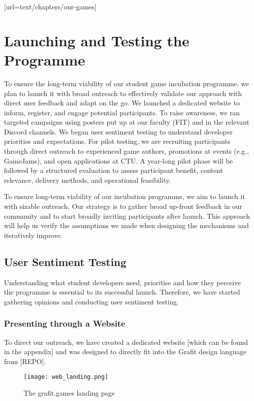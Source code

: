 [url=text/chapters/our-games]
\chapter{Launching and Testing the Programme}\label{chap:launch-testing}

\begin{chapterabstract}
	To ensure the long-term viability of our student game incubation programme, we plan to launch it with broad outreach to effectively validate our approach with direct user feedback and adapt on the go. We launched a dedicated website to inform, register, and engage potential participants. To raise awareness, we ran targeted campaigns using posters put up at our faculty (FIT) and in the relevant Discord channels. We began user sentiment testing to understand developer priorities and expectations. For pilot testing, we are recruiting participants through direct outreach to experienced game authors, promotions at events (e.g., GameJams), and open applications at CTU. A year-long pilot phase will be followed by a structured evaluation to assess participant benefit, content relevance, delivery methods, and operational feasibility.
\end{chapterabstract}

To ensure long-term viability of our incubation programme, we aim to launch it with sizable outreach. Our strategy is to gather broad up-front feedback in our community and to start broadly inviting participants after launch. This approach will help us verify the assumptions we made when designing the mechanisms and iteratively improve.

\section{User Sentiment Testing}
Understanding what student developers need, prioritise and how they perceive the programme is essential to its successful launch. Therefore, we have started gathering opinions and conducting user sentiment testing.

\subsection{Presenting through a Website}
To direct our outreach, we have created a dedicated website [which can be found in the appendix] and was designed to directly fit into the Grafit design language from [REPO].
\begin{figure}[H]
    \texttt{[image: web\_landing.png]}
    \caption{The grafit.games landing page}
    \label{fig:web_landing}
\end{figure}

